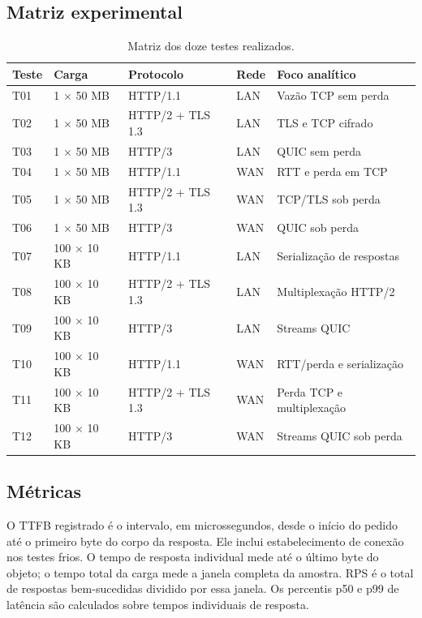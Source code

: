\documentclass[12pt,a4paper]{article}
\begin{document}
\subsection{Matriz experimental}

\begin{table}[H]
\centering
\small
\caption{Matriz dos doze testes realizados.}
\begin{tabularx}{\textwidth}{@{}l l l l X@{}}
\toprule
Teste & Carga & Protocolo & Rede & Foco analítico\\
\midrule
T01 & 1 $\times$ 50 MB & HTTP/1.1 & LAN & Vazão TCP sem perda\\
T02 & 1 $\times$ 50 MB & HTTP/2 + TLS 1.3 & LAN & TLS e TCP cifrado\\
T03 & 1 $\times$ 50 MB & HTTP/3 & LAN & QUIC sem perda\\
T04 & 1 $\times$ 50 MB & HTTP/1.1 & WAN & RTT e perda em TCP\\
T05 & 1 $\times$ 50 MB & HTTP/2 + TLS 1.3 & WAN & TCP/TLS sob perda\\
T06 & 1 $\times$ 50 MB & HTTP/3 & WAN & QUIC sob perda\\
T07 & 100 $\times$ 10 KB & HTTP/1.1 & LAN & Serialização de respostas\\
T08 & 100 $\times$ 10 KB & HTTP/2 + TLS 1.3 & LAN & Multiplexação HTTP/2\\
T09 & 100 $\times$ 10 KB & HTTP/3 & LAN & Streams QUIC\\
T10 & 100 $\times$ 10 KB & HTTP/1.1 & WAN & RTT/perda e serialização\\
T11 & 100 $\times$ 10 KB & HTTP/2 + TLS 1.3 & WAN & Perda TCP e multiplexação\\
T12 & 100 $\times$ 10 KB & HTTP/3 & WAN & Streams QUIC sob perda\\
\bottomrule
\end{tabularx}
\end{table}

\subsection{Métricas}

O TTFB registrado é o intervalo, em microssegundos, desde o início do pedido até o primeiro
byte do corpo da resposta. Ele inclui estabelecimento de conexão nos testes frios. O tempo
de resposta individual mede até o último byte do objeto; o tempo total da carga mede a janela
completa da amostra. RPS é o total de respostas bem-sucedidas dividido por essa janela.
Os percentis p50 e p99 de latência são calculados sobre tempos individuais de resposta.
\end{document}
